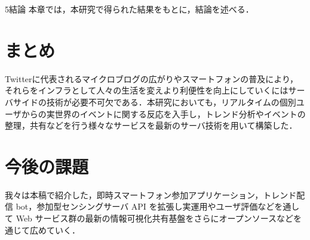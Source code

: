 \chapterhead
{5}{結論}
{本章では，本研究で得られた結果をもとに，結論を述べる．}

\section{まとめ}
Twitterに代表されるマイクロブログの広がりやスマートフォンの普及により，それらをインフラとして人々の生活を変えより利便性を向上にしていくにはサーバサイドの技術が必要不可欠である．本研究においても，リアルタイムの個別ユーザからの実世界のイベントに関する反応を入手し，トレンド分析やイベントの整理，共有などを行う様々なサービスを最新のサーバ技術を用いて構築した．

\section{今後の課題}
我々は本稿で紹介した，即時スマートフォン参加アプリケーション，トレンド配信 bot，参加型センシングサーバ API を拡張し実運用やユーザ評価などを通して Web サービス群の最新の情報可視化共有基盤をさらにオープンソースなどを通じて広めていく．
